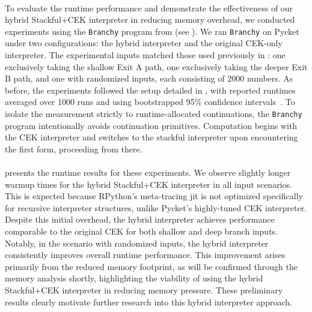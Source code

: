       \paragraph{}%
        To evaluate the runtime performance and demonstrate the effectiveness of our hybrid Stackful+CEK interpreter in reducing memory overhead, we conducted experiments using the \texttt{Branchy} program from  (see ). We ran \texttt{Branchy} on Pycket under two configurations: the hybrid interpreter and the original CEK-only interpreter. The experimental inputs matched those used previously in : one exclusively taking the shallow Exit A path, one exclusively taking the deeper Exit B path, and one with randomized inputs, each consisting of 2000 numbers. As before, the experiments followed the setup detailed in , with reported runtimes averaged over 1000 runs and using bootstrapped 95\% confidence intervals~\cite{davisonBootstrapMethods2013}. To isolate the measurement strictly to runtime-allocated continuations, the \texttt{Branchy} program intentionally avoids continuation primitives. Computation begins with the CEK interpreter and switches to the stackful interpreter upon encountering the first  form, proceeding from there.


      \paragraph{}%
         presents the runtime results for these experiments. We observe slightly longer warmup times for the hybrid Stackful+CEK interpreter in all input scenarios. This is expected because RPython's meta-tracing \gls{jit} is not optimized specifically for recursive interpreter structures, unlike Pycket's highly-tuned CEK interpreter. Despite this initial overhead, the hybrid interpreter achieves performance comparable to the original CEK for both shallow and deep branch inputs. Notably, in the scenario with randomized inputs, the hybrid interpreter consistently improves overall runtime performance. This improvement arises primarily from the reduced memory footprint, as will be confirmed through the memory analysis shortly, highlighting the viability of using the hybrid Stackful+CEK interpreter in reducing memory pressure. These preliminary results clearly motivate further research into this hybrid interpreter approach.

